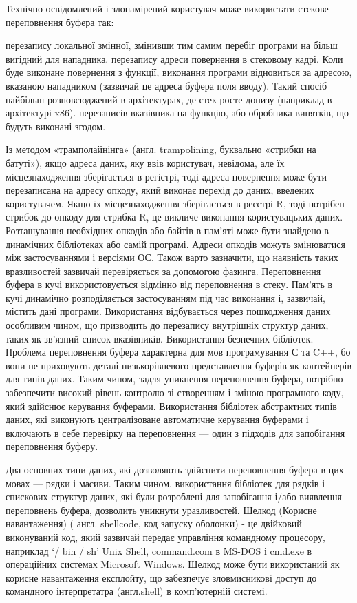 Технічно освідомлений і злонамірений користувач може використати стекове переповнення буфера так:
\begin{enumerate}
 перезапису локальної змінної, змінивши тим самим перебіг програми на більш вигідний для нападника.
 перезапису адреси повернення в стековому кадрі. Коли буде виконане повернення з функції, виконання програми відновиться за адресою, вказаною нападником (зазвичай це адреса буфера поля вводу). Такий спосіб найбільш розповсюджений в архітектурах, де стек росте донизу (наприклад в архітектурі x86).
 перезаписів вказівника на функцію, або обробника винятків, що будуть виконані згодом. 
\end{enumerate}


Із методом «трамполайнінга» (англ. trampolining, буквально «стрибки на батуті»), якщо адреса даних, яку ввів користувач, невідома, але їх місцезнаходження зберігається в регістрі, тоді адреса повернення може бути перезаписана на адресу опкоду, який виконає перехід до даних, введених користувачем. Якщо їх місцезнаходження зберігається в реєстрі R, тоді потрібен стрибок до опкоду для стрибка R, це викличе виконання користувацьких даних. Розташування необхідних опкодів або байтів в пам'яті може бути знайдено в динамічних бібліотеках або самій програмі. Адреси опкодів можуть змінюватися між застосуваннями і версіями ОС.
Також варто зазначити, що наявність таких вразливостей зазвичай перевіряється за допомогою фазинга.
Переповнення буфера в кучі використовується відмінно від переповнення в стеку. Пам'ять в кучі динамічно розподіляється застосуванням під час виконання і, зазвичай, містить дані програми. Використання відбувається через пошкодження даних особливим чином, що призводить до перезапису внутрішніх структур даних, таких як зв'язний список вказівників.
Використання безпечних бібліотек. Проблема переповнення буфера характерна для мов програмування С та C++, бо вони не приховують деталі низькорівневого представлення буферів як контейнерів для типів даних. Таким чином, задля уникнення переповнення буфера, потрібно забезпечити високий рівень контролю зі створенням і зміною програмного коду, який здійснює керування буферами. Використання бібліотек абстрактних типів даних, які виконують централізоване автоматичне керування буферами і включають в себе перевірку на переповнення — один з підходів для запобігання переповнення буферу.


Два основних типи даних, які дозволяють здійснити переповнення буфера в цих мовах — рядки і масиви. Таким чином, використання бібліотек для рядків і спискових структур даних, які були розроблені для запобігання і/або виявлення переповнень буфера, дозволить уникнути уразливостей.
Шелкод (Корисне навантаження) ( англ. shellcode, код запуску оболонки) - це двійковий виконуваний код, який зазвичай передає управління командному процесору,  наприклад `/ bin / sh'  Unix Shell, command.com в MS-DOS і cmd.exe в операційних системах Microsoft Windows.  Шелкод може бути використаний як корисне навантаження експлойту, що забезпечує зловмисникові доступ до командного інтерпретатра (англ.shell) в комп'ютерній системі.

